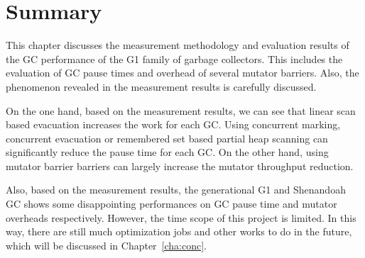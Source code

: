 \section{Summary} %
\label{sec:summary}

This chapter discusses the measurement methodology and evaluation results of the
GC performance of the G1 family of garbage collectors. This includes the evaluation of
GC pause times and overhead of several mutator barriers. Also, the phenomenon revealed
in the measurement results is carefully discussed.

On the one hand, based on the measurement results, we can see that linear scan based evacuation
increases the work for each GC. Using concurrent marking, concurrent evacuation
or remembered set based partial heap scanning can significantly reduce the pause time
for each GC. On the other hand, using mutator barrier barriers can largely increase the
mutator throughput reduction.

Also, based on the measurement results, the generational G1 and Shenandoah GC shows some
disappointing performances on GC pause time and mutator overheads respectively.
However, the time scope of this project is limited.
In this way, there are still much optimization jobs and other works to do in the future,
which will be discussed in Chapter~\ref{cha:conc}.







%   

%       

%       

